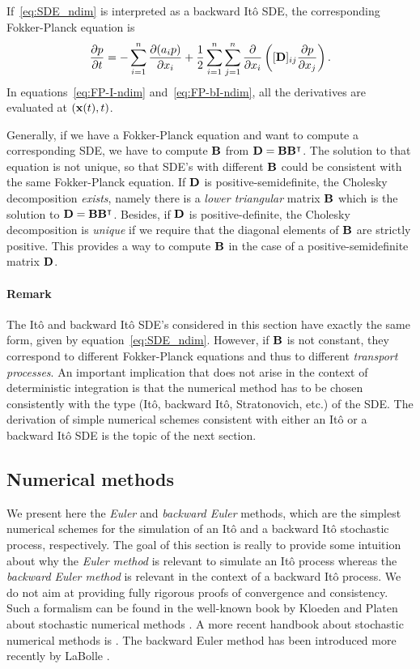 If~\eqref{eq:SDE_ndim} is interpreted as a backward Itô SDE, the corresponding Fokker-Planck equation is
\begin{equation} \label{eq:FP-bI-ndim}
	\frac{\partial p}{\partial t} = -\sum_{i=1}^n \frac{\partial(a_ip)}{\partial x_i} + \frac{1}{2} \sum_{i=1}^n \sum_{j=1}^n \frac{\partial}{\partial x_i}\left( [\mathbf D]_{ij} \frac{\partial p}{\partial x_j} \right).
\end{equation}
In equations~\eqref{eq:FP-I-ndim} and~\eqref{eq:FP-bI-ndim}, all the derivatives are evaluated at $(\mathbf x(t),t)$.

Generally, if we have a Fokker-Planck equation and want to compute a corresponding SDE, we have to compute $\mathbf B$ from $\mathbf D = \mathbf B \mathbf B^{\intercal}$. The solution to that equation is not unique, so that SDE's with different $\mathbf B$ could be consistent with the same Fokker-Planck equation. If $\mathbf D$ is positive-semidefinite, the Cholesky decomposition \textit{exists}, namely there is a \textit{lower triangular} matrix $\mathbf B$ which is the solution to $\mathbf D = \mathbf B \mathbf B^{\intercal}$. Besides, if $\mathbf D$ is positive-definite, the Cholesky decomposition is \textit{unique} if we require that the diagonal elements of $\mathbf B$ are strictly positive. This provides a way to compute $\mathbf B$ in the case of a positive-semidefinite matrix $\mathbf D$.

\paragraph{Remark} The Itô and backward Itô SDE's considered in this section have exactly the same form, given by equation~\eqref{eq:SDE_ndim}. However, if $\mathbf B$ is not constant, they correspond to different Fokker-Planck equations and thus to different \textit{transport processes}. An important implication that does not arise in the context of deterministic integration is that the numerical method has to be chosen consistently with the type (Itô, backward Itô, Stratonovich, etc.) of the SDE. The derivation of simple numerical schemes consistent with either an Itô or a backward Itô SDE is the topic of the next section.

\subsection{Numerical methods} \label{sec:numericalmethods}
We present here the \textit{Euler} and \textit{backward Euler} methods, which are the simplest numerical schemes for the simulation of an Itô and a backward Itô stochastic process, respectively. The goal of this section is really to provide some intuition about why the \textit{Euler method} is relevant to simulate an Itô process whereas the \textit{backward Euler method} is relevant in the context of a backward Itô process. We do not aim at providing fully rigorous proofs of convergence and consistency. Such a formalism can be found in the well-known book by Kloeden and Platen about stochastic numerical methods \cite{kloedenplaten1995numerical}. A more recent handbook about stochastic numerical methods is \cite{colet2014stochastic}. The backward Euler method has been introduced more recently by LaBolle \cite{labolle2000diffusion}.

